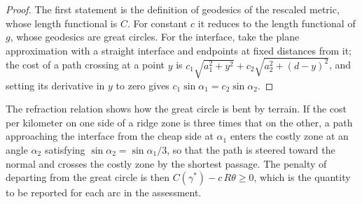 \begin{proof}
The first statement is the definition of geodesics of the rescaled metric, whose length functional is $C$. For constant $c$ it reduces to the length functional of $g$, whose geodesics are great circles. For the interface, take the plane approximation with a straight interface and endpoints at fixed distances from it; the cost of a path crossing at a point $y$ is $c_1\sqrt{a_1^2+y^2}+c_2\sqrt{a_2^2+(d-y)^2}$, and setting its derivative in $y$ to zero gives $c_1\sin\alpha_1=c_2\sin\alpha_2$.
\end{proof}

The refraction relation shows how the great circle is bent by terrain. If the cost per kilometer on one side of a ridge zone is three times that on the other, a path approaching the interface from the cheap side at $\alpha_1$ enters the costly zone at an angle $\alpha_2$ satisfying $\sin\alpha_2=\sin\alpha_1/3$, so that the path is steered toward the normal and crosses the costly zone by the shortest passage. The penalty of departing from the great circle is then $C(\gamma^\ast)-c\,R\theta\ge0$, which is the quantity to be reported for each arc in the assessment.
